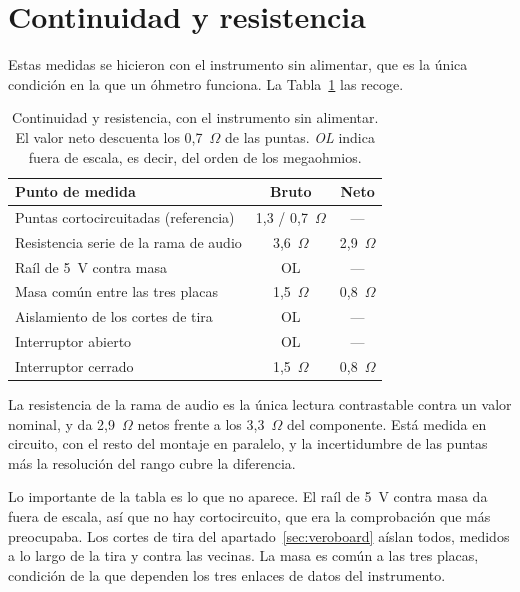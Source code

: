 \section{Continuidad y resistencia}
\label{sec:continuidad}

Estas medidas se hicieron con el instrumento sin alimentar, que es la única
condición en la que un óhmetro funciona. La Tabla~\ref{tab:continuidad} las recoge.

\begin{table}[htbp]
    \centering
    \caption{Continuidad y resistencia, con el instrumento sin alimentar. El
             valor neto descuenta los 0,7~$\Omega$ de las puntas. \emph{OL}
             indica fuera de escala, es decir, del orden de los megaohmios.}
    \label{tab:continuidad}
    \begin{tabular}{lcc}
        \toprule
        \textbf{Punto de medida} & \textbf{Bruto} & \textbf{Neto} \\
        \midrule
        Puntas cortocircuitadas (referencia)       & 1,3 / 0,7~$\Omega$ & --- \\
        Resistencia serie de la rama de audio      & 3,6~$\Omega$ & 2,9~$\Omega$ \\
        Raíl de 5~V contra masa                    & OL & --- \\
        Masa común entre las tres placas           & 1,5~$\Omega$ & 0,8~$\Omega$ \\
        Aislamiento de los cortes de tira          & OL & --- \\
        Interruptor abierto                        & OL & --- \\
        Interruptor cerrado                        & 1,5~$\Omega$ & 0,8~$\Omega$ \\
        \bottomrule
    \end{tabular}
\end{table}

La resistencia de la rama de audio es la única lectura contrastable contra un
valor nominal, y da 2,9~$\Omega$ netos frente a los 3,3~$\Omega$ del
componente. Está medida en circuito, con el resto del montaje en paralelo, y la
incertidumbre de las puntas más la resolución del rango cubre la diferencia.

Lo importante de la tabla es lo que no aparece. El raíl de 5~V contra masa da
fuera de escala, así que no hay cortocircuito, que era la comprobación que más
preocupaba. Los cortes de tira del
apartado~\ref{sec:veroboard} aíslan todos, medidos a lo largo de la tira y
contra las vecinas. La masa es común a las tres placas, condición de la que
dependen los tres enlaces de datos del instrumento.

